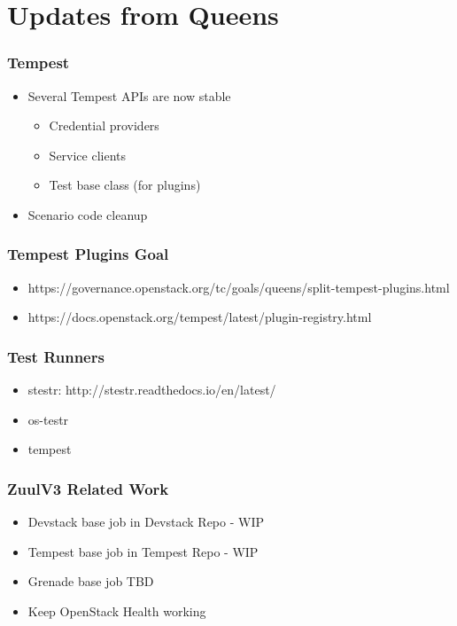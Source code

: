\documentclass[aspectratio=169,11pt,hyperref={colorlinks=true}]{beamer}
\begin{document}
\section{Updates from Queens}
\begin{frame}
    \frametitle{Tempest}
    \begin{itemize}
        \item{Several Tempest APIs are now stable}
        \begin{itemize}
            \item{Credential providers}
            \item{Service clients}
            \item{Test base class (for plugins)}
        \end{itemize}
        \item{Scenario code cleanup}
    \end{itemize}
\end{frame}

\begin{frame}
    \frametitle{Tempest Plugins Goal}
    \begin{itemize}
        \item{https://governance.openstack.org/tc/goals/queens/split-tempest-plugins.html}
        \item{https://docs.openstack.org/tempest/latest/plugin-registry.html}
    \end{itemize}
\end{frame}

\begin{frame}
    \frametitle{Test Runners}
    \begin{itemize}
        \item{stestr: http://stestr.readthedocs.io/en/latest/}
        \item{os-testr}
        \item{tempest}
    \end{itemize}
\end{frame}

\begin{frame}
    \frametitle{ZuulV3 Related Work}
    \begin{itemize}
        \item{Devstack base job in Devstack Repo - WIP}
        \item{Tempest base job in Tempest Repo - WIP}
        \item{Grenade base job TBD}
        \item{Keep OpenStack Health working}
    \end{itemize}
\end{frame}
\end{document}
